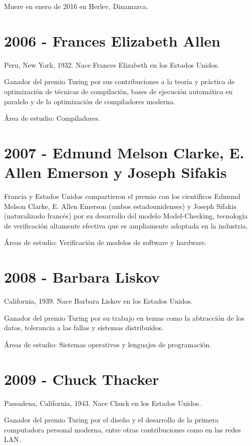 \documentclass[notitlepage,letterpaper, 11pt]{article}
\begin{document}
\noindent Muere en enero de 2016 en Herlev, Dinamarca.
\newline

\section*{2006 - Frances Elizabeth Allen}
\noindent Peru, New York, 1932. Nace Frances Elizabeth en los Estados Unidos.

\noindent Ganador del premio Turing por sus contribuciones a la teoría y práctica de optimización de técnicas de compilación, bases de ejecución automática en paralelo y de la optimización de compiladores moderna.

\noindent Área de estudio: Compiladores.
\newline

\section*{2007 - Edmund Melson Clarke, E. Allen Emerson y Joseph Sifakis}
\noindent Francia y Estados Unidos compartieron el premio con los científicos Edmund Melson Clarke, E. Allen Emerson (ambos estadounidenses) y Joseph Sifakis (naturalizado francés) por su desarrollo del modelo Model-Checking, tecnología de verificación altamente efectiva que es ampliamente adoptada en la industria.

\noindent Áreas de estudio: Verificación de modelos de software y hardware.
\newline

\section*{2008 - Barbara Liskov}
\noindent California, 1939. Nace Barbara Liskov en los Estados Unidos.

\noindent Ganador del premio Turing por su trabajo en temas como la abtracción de los datos, tolerancia a las fallas y sistemas distribuidos.

\noindent Áreas de estudio: Sistemas operativos y lenguajes de programación.
\newline

\section*{2009 - Chuck Thacker}
\noindent Passadena, California, 1943. Nace Chuck en los Estados Unidos.

\noindent Ganador del premio Turing por el diseño y el desarrollo de la primera computadora personal moderna, entre otras contribuciones como en las redes LAN.
\end{document}
